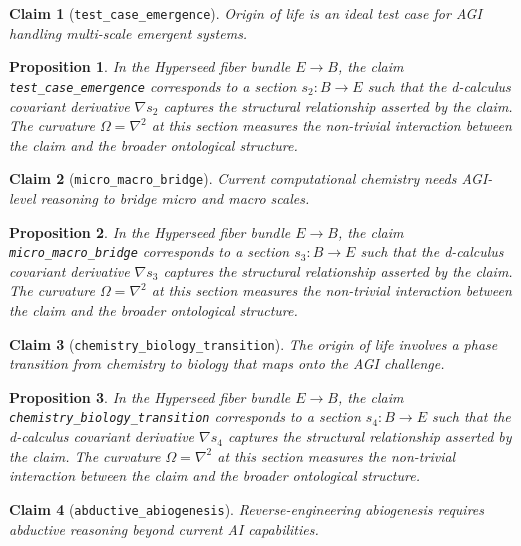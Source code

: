 \documentclass{article}
\newtheorem{claim}{Claim}
\newtheorem{proposition}{Proposition}
\begin{document}
\begin{claim}[\texttt{test_case_emergence}]
Origin of life is an ideal test case for AGI handling multi-scale emergent systems.
\end{claim}

\begin{proposition}
In the Hyperseed fiber bundle $E \to B$, the claim \texttt{test_case_emergence} corresponds to a section $s_2: B \to E$ such that the d-calculus covariant derivative $\nabla s_2$ captures the structural relationship asserted by the claim. The curvature $\Omega = \nabla^2$ at this section measures the non-trivial interaction between the claim and the broader ontological structure.
\end{proposition}

\begin{claim}[\texttt{micro_macro_bridge}]
Current computational chemistry needs AGI-level reasoning to bridge micro and macro scales.
\end{claim}

\begin{proposition}
In the Hyperseed fiber bundle $E \to B$, the claim \texttt{micro_macro_bridge} corresponds to a section $s_3: B \to E$ such that the d-calculus covariant derivative $\nabla s_3$ captures the structural relationship asserted by the claim. The curvature $\Omega = \nabla^2$ at this section measures the non-trivial interaction between the claim and the broader ontological structure.
\end{proposition}

\begin{claim}[\texttt{chemistry_biology_transition}]
The origin of life involves a phase transition from chemistry to biology that maps onto the AGI challenge.
\end{claim}

\begin{proposition}
In the Hyperseed fiber bundle $E \to B$, the claim \texttt{chemistry_biology_transition} corresponds to a section $s_4: B \to E$ such that the d-calculus covariant derivative $\nabla s_4$ captures the structural relationship asserted by the claim. The curvature $\Omega = \nabla^2$ at this section measures the non-trivial interaction between the claim and the broader ontological structure.
\end{proposition}

\begin{claim}[\texttt{abductive_abiogenesis}]
Reverse-engineering abiogenesis requires abductive reasoning beyond current AI capabilities.
\end{claim}
\end{document}
